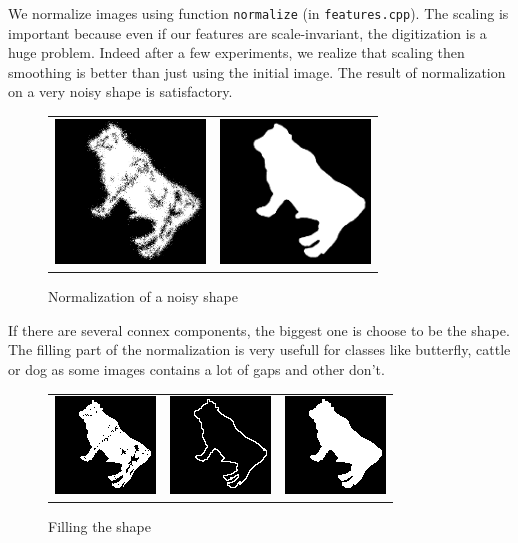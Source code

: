 \documentclass[a4paper, 11pt]{article}
\begin{document}
\noindent We normalize images using function \verb|normalize| (in \verb|features.cpp|).
The scaling is important because even if our features are scale-invariant, the digitization is a huge problem. Indeed after a few experiments, we realize that scaling then smoothing is better than just using the initial image. The result of normalization on a very noisy shape is satisfactory. 

\begin{figure}[h!]
\centering
\begin{tabular}{ll}
\includegraphics[width=4cm]{normalize-noisy-1.png} &
\includegraphics[width=4cm]{normalize-noisy-2.png} \\
\end{tabular}
\caption{Normalization of a noisy shape}
\end{figure}
 
\noindent If there are several connex components, the biggest one is choose to be the shape. The filling part of the normalization is very usefull for classes like butterfly, cattle or dog as some images contains a lot of gaps and other don't.

\begin{figure}[h!]
\centering
\begin{tabular}{ccc}
\includegraphics{normalize-1.png} &
\includegraphics{normalize-2.png} &
\includegraphics{normalize-3.png} \\
\end{tabular}
\caption{Filling the shape}
\end{figure}
\end{document}
